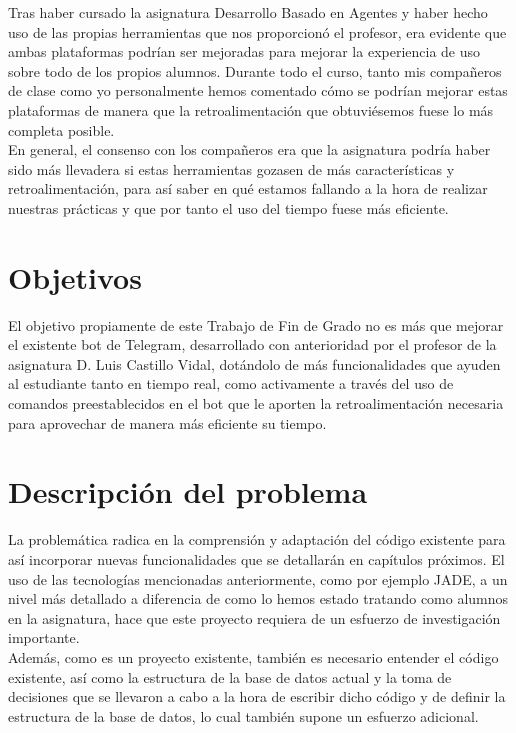 Tras haber cursado la asignatura Desarrollo Basado en Agentes y haber hecho uso de las propias herramientas que nos proporcionó el profesor, era evidente que ambas plataformas podrían ser mejoradas para mejorar la experiencia de uso sobre todo de los propios alumnos. Durante todo el curso, tanto mis compañeros de clase como yo personalmente hemos comentado cómo se podrían mejorar estas plataformas de manera que la retroalimentación que obtuviésemos fuese lo más completa posible.\\

En general, el consenso con los compañeros era que la asignatura podría haber sido más llevadera si estas herramientas gozasen de más características y retroalimentación, para así saber en qué estamos fallando a la hora de realizar nuestras prácticas y que por tanto el uso del tiempo fuese más eficiente.

\section{Objetivos}

El objetivo propiamente de este Trabajo de Fin de Grado no es más que mejorar el existente bot de Telegram, desarrollado con anterioridad por el profesor de la asignatura D. Luis Castillo Vidal, dotándolo de más funcionalidades que ayuden al estudiante tanto en tiempo real, como activamente a través del uso de comandos preestablecidos en el bot que le aporten la retroalimentación necesaria para aprovechar de manera más eficiente su tiempo.

\section{Descripción del problema}

La problemática radica en la comprensión y adaptación del código existente para así incorporar nuevas funcionalidades que se detallarán en capítulos próximos. El uso de las tecnologías mencionadas anteriormente, como por ejemplo JADE, a un nivel más detallado a diferencia de como lo hemos estado tratando como alumnos en la asignatura, hace que este proyecto requiera de un esfuerzo de investigación importante.\\

Además, como es un proyecto existente, también es necesario entender el código existente, así como la estructura de la base de datos actual y la toma de decisiones que se llevaron a cabo a la hora de escribir dicho código y de definir la estructura de la base de datos, lo cual también supone un esfuerzo adicional.